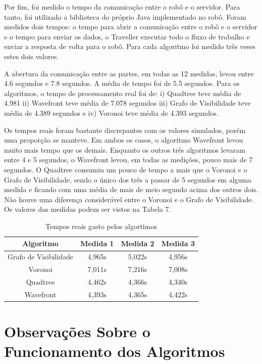 Por fim, foi medido o tempo da comunicação entre o robô e o servidor. Para tanto, foi utilizado a biblioteca do próprio Java implementado no robô. Foram medidos dois tempos: o tempo para abrir a comunicação entre o robô e o servidor e o tempo para enviar os dados, o Traveller executar todo o fluxo de trabalho e enviar a resposta de volta para o robô. Para cada algoritmo foi medido três veses estes dois valores.

A abertura da comunicação entre as partes, em todas as 12 medidas, levou entre 4.6 segundos e 7.8 segundos. A média de tempo foi de 5.5 segundos. Para os algoritmos, o tempo de processamento real foi de: i) Quadtree teve média de 4.981 ii) Wavefront teve média de 7.078 segundos iii) Grafo de Visibilidade teve média de 4.389 segundos e iv) Voronoi teve média de 4.393 segundos.

Os tempos reais foram bastante discrepantes com os valores simulados, porém uma proporção se manteve. Em ambos os casos, o algoritmo Wavefront levou muito mais tempo que os demais. Enquanto os outros três algoritmos levaram entre 4 e 5 segundos, o Wavefront levou, em todas as medições, pouco mais de 7 segundos. O Quadtree consumiu um pouco de tempo a mais que o Voronoi e o Grafo de Visibilidade, sendo o único dos três a passar de 5 segundos em alguma medida e ficando com uma média de mais de meio segundo acima dos outros dois. Não houve uma diferença considerável entre o Voronoi e o Grafo de Visibilidade. Os valores das medidas podem ser vistos na Tabela 7.

\begin{table}[h]
	\centering
	\label{tab07}
	\begin{tabular}{c|c|c|c}
		\toprule
		\textbf{Algoritmo} & \textbf{Medida 1} & \textbf{Medida 2} & \textbf{Medida 3} \\
		\midrule
Grafo de Visibilidade & 4,965s  & 5,022s & 4,956s \\
Voronoi 				  & 7,011s  & 7,216s & 7,008s \\
Quadtree				  & 4,462s  & 4,366s & 4,340s \\
Wavefront             & 4,393s  & 4,365s & 4,422s  \\
		\bottomrule
	\end{tabular}
	\caption{Tempos reais gasto pelos algortimos}
\end{table}

\section{Observações Sobre o Funcionamento dos Algoritmos}


